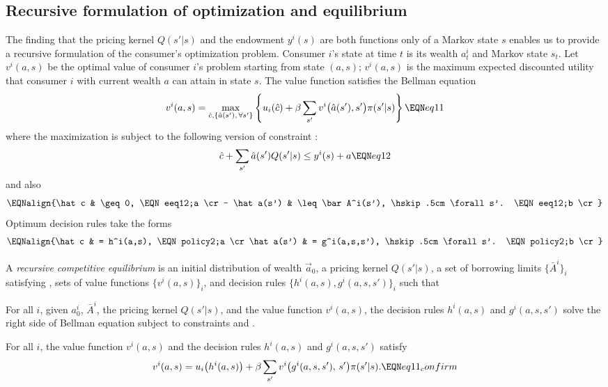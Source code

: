 \subsection{Recursive formulation of optimization and equilibrium}
The finding that the pricing kernel $Q(s'|s)$ and the endowment $y^i(s)$
are both functions only of a Markov state $s$ enables us to provide a
recursive formulation of the consumer's optimization problem.
Consumer $i$'s state at time $t$ is its wealth $a^i_t$ and Markov state $s_t$.
Let $v^i(a,s)$ be the optimal value of consumer $i$'s problem
starting from state $(a, s)$;     $v^i(a,s)$ is the maximum
expected discounted utility  that consumer $i$ with current wealth $a$
can attain in state $s$.
The value function satisfies the Bellman equation %
$$ v^i(a, s) = \max_{\hat c, \{\hat a(s'),\, \forall s'\}} 
\left\{ u_i(\hat c) + \beta
\sum_{s'} v^i\bigl(\hat a(s'),s'\bigr) 
                 \pi (s' | s) \right\} \EQN eq11 $$
where the maximization is subject to the following version
of constraint :
$$ \hat c + \sum_{s'} \hat a(s') Q(s' | s)
     \leq  y^i(s) + a  \EQN eq12   $$
and also
$$\EQNalign{\hat c & \geq 0, \EQN eeq12;a \cr
           -   \hat a(s') & \leq \bar A^i(s'), \hskip.5cm \forall s'.   \EQN eeq12;b \cr}$$
Optimum decision rules take the forms
$$\EQNalign{\hat c & =  h^i(a,s), \EQN policy2;a \cr
  \hat a(s') & = g^i(a,s,s'), \hskip.5cm \forall s'. 
                                  \EQN policy2;b \cr}$$


\medskip{} A {\it  recursive competitive equilibrium} is
an initial distribution of wealth $\vec a_0$, 
a pricing kernel $Q(s' | s)$, 
a set of borrowing limits $\{\bar A^i \}_i$
satisfying ,
sets of value functions $\{v^i(a,s)\}_i$, and
decision rules $\{h^i(a,s), g^i(a,s,s')\}_i$ such
that

\medskip
{} For all $i$, given
$a^i_0$, $\bar A^i$, the pricing kernel $Q(s' | s)$, and
the value function $v^i(a,s)$, the decision rules
$h^i(a,s)$ and $g^i(a,s,s')$ solve the right side
of Bellman equation  subject to constraints
 and .

\medskip
{} For all $i$, the value function
$v^i(a,s)$ and the decision rules
$h^i(a,s)$ and $g^i(a,s,s')$ satisfy
$$ v^i(a, s) = u_i\bigl(h^i(a,s)\bigr) + \beta
\sum_{s'} v^i\bigl(g^i(a,s,s'),\,s'\bigr) 
                 \pi (s' | s).  \EQN eq11_confirm $$

